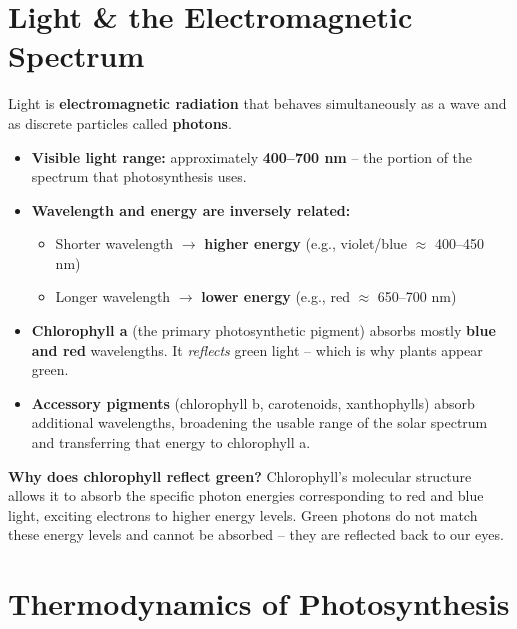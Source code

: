 \documentclass[11pt, letterpaper]{article}
\begin{document}
\section*{Light \& the Electromagnetic Spectrum}

Light is \textbf{electromagnetic radiation} that behaves simultaneously as a wave and as discrete particles called \textbf{photons}.

\begin{itemize}[noitemsep]
  \item \textbf{Visible light range:} approximately \textbf{400--700 nm} -- the portion of the spectrum that photosynthesis uses.
  \item \textbf{Wavelength and energy are inversely related:}
    \begin{itemize}[noitemsep]
      \item Shorter wavelength $\to$ \textbf{higher energy} (e.g., violet/blue $\approx$ 400--450 nm)
      \item Longer wavelength $\to$ \textbf{lower energy} (e.g., red $\approx$ 650--700 nm)
    \end{itemize}
  \item \textbf{Chlorophyll a} (the primary photosynthetic pigment) absorbs mostly \textbf{blue and red} wavelengths. It \emph{reflects} green light -- which is why plants appear green.
  \item \textbf{Accessory pigments} (chlorophyll b, carotenoids, xanthophylls) absorb additional wavelengths, broadening the usable range of the solar spectrum and transferring that energy to chlorophyll a.
\end{itemize}

\begin{tcolorbox}[colback=part2bg, colframe=sectiongreen, arc=3pt, boxrule=1pt]
\textbf{Why does chlorophyll reflect green?} Chlorophyll's molecular structure allows it to absorb the specific photon energies corresponding to red and blue light, exciting electrons to higher energy levels. Green photons do not match these energy levels and cannot be absorbed -- they are reflected back to our eyes.
\end{tcolorbox}

\section*{Thermodynamics of Photosynthesis}
\end{document}

